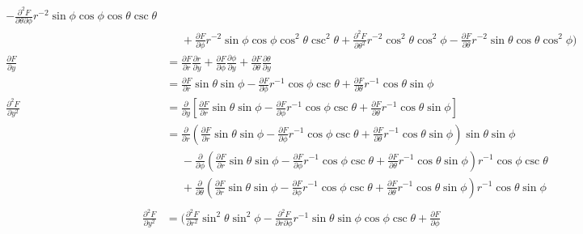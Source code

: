 \documentclass[12pt]{article}
\begin{document}
\begin{gather*}
\begin{aligned}
			- \frac{\partial^2 F} {\partial\theta \partial\phi}
			r^{-2}\sin\phi\cos\phi\cos\theta\csc\theta \\
		&\phantom{=} 
			+ \frac{\partial F} {\partial \phi}
			r^{-2}\sin\phi\cos\phi\cos^2\theta\csc^2\theta
			+\frac{\partial^2 F} {\partial\theta^2} r^{-2}\cos^2\theta\cos^2\phi 
			-\frac{\partial F} {\partial \theta} r^{-2}\sin\theta\cos\theta\cos^2\phi 
			\biggl) \\
		\frac{\partial F}{\partial y} 
			&= \frac{\partial F} {\partial r} \frac{\partial r}{\partial y}
			+ \frac{\partial F} {\partial \phi} \frac{\partial \phi}{\partial y}
			+ \frac{\partial F} {\partial \theta} \frac{\partial \theta}{\partial y} \\
		&= \frac{\partial F} {\partial r} \sin\theta\sin\phi
			- \frac{\partial F} {\partial \phi} r^{-1}\cos\phi\csc\theta 
			+ \frac{\partial F} {\partial \theta} r^{-1}\cos\theta\sin\phi \\
		\frac{\partial^2 F}{\partial y^2} 
			&=\frac{\partial}{\partial y} \left[ 
				\frac{\partial F} {\partial r} \sin\theta\sin\phi
				- \frac{\partial F} {\partial \phi} r^{-1}\cos\phi\csc\theta 
				+ \frac{\partial F} {\partial \theta} r^{-1}\cos\theta\sin\phi
			\right] \\
		&= \frac{\partial}{\partial r} 
			\left( 
				\frac{\partial F} {\partial r} \sin\theta\sin\phi
				- \frac{\partial F} {\partial \phi} r^{-1}\cos\phi\csc\theta 
				+ \frac{\partial F} {\partial \theta} r^{-1}\cos\theta\sin\phi
			\right) 
			\sin\theta\sin\phi \\
		&\phantom{=} -\frac{\partial}{\partial \phi} 
			\left( 
				\frac{\partial F} {\partial r} \sin\theta\sin\phi
				- \frac{\partial F} {\partial \phi} r^{-1}\cos\phi\csc\theta 
				+ \frac{\partial F} {\partial \theta} r^{-1}\cos\theta\sin\phi
			\right) 
			r^{-1}\cos\phi\csc\theta  \\
		&\phantom{=} +\frac{\partial}{\partial \theta}
			\left( 
				\frac{\partial F} {\partial r} \sin\theta\sin\phi
				- \frac{\partial F} {\partial \phi} r^{-1}\cos\phi\csc\theta 
				+ \frac{\partial F} {\partial \theta} r^{-1}\cos\theta\sin\phi
			\right) 
			r^{-1}\cos\theta\sin\phi \\
	\end{aligned}
	\begin{aligned}
		\frac{\partial^2 F}{\partial y^2} 
		&= \biggl( 
				\frac{\partial^2 F} {\partial r^2} \sin^2\theta\sin^2\phi
				- \frac{\partial^2 F} {\partial r \partial\phi}
					r^{-1}\sin\theta\sin\phi\cos\phi\csc\theta 
				+ \frac{\partial F} {\partial \phi}

\end{aligned}
\end{gather*}
\end{document}
